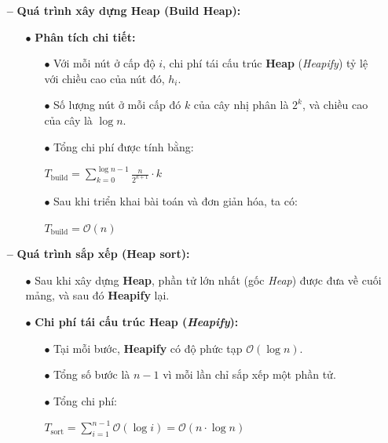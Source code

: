 \begin{itemize}
    \item [\textbf{--}] \textbf{Quá trình xây dựng Heap (Build Heap):}
    \begin{itemize}
        \item [$\bullet$] \textbf{Phân tích chi tiết:}
        \begin{itemize}
            \item [$\bullet$] Với mỗi nút ở cấp độ $i$, chi phí tái cấu trúc \textbf{Heap} (\textit{Heapify}) tỷ lệ với chiều cao của nút đó, $h_i$.
            \item [$\bullet$] Số lượng nút ở mỗi cấp đó $k$ của cây nhị phân là $2^k$, và chiều cao của cây là $\log n$.
            \item [$\bullet$] Tổng chi phí được tính bằng:\cite{basir2020analisis}
            \begin{center}
                $T_{\text{build}} = \sum_{k=0}^{\log n - 1} \frac{n}{2^{k+1}} \cdot k$
            \end{center}
            \item [$\bullet$] Sau khi triển khai bài toán và đơn giản hóa, ta có:
            \begin{center}
                $T_{\text{build}} = \mathcal{O}(n)$
            \end{center}
        \end{itemize}
    \end{itemize}
    \item [\textbf{--}] \textbf{Quá trình sắp xếp (Heap sort):}
    \begin{itemize}
        \item [$\bullet$] Sau khi xây dựng \textbf{Heap}, phần tử lớn nhất (gốc \textit{Heap}) được đưa về cuối mảng, và sau đó \textbf{Heapify} lại.
        \item [$\bullet$] \textbf{Chi phí tái cấu trúc Heap (\textit{Heapify}):}
        \begin{itemize}
            \item [$\bullet$] Tại mỗi bước, \textbf{Heapify} có độ phức tạp $\mathcal{O}(\log n)$.
            \item [$\bullet$] Tổng số bước là $n-1$ vì mỗi lần chỉ sắp xếp một phần tử.
            \item [$\bullet$] Tổng chi phí:
            \begin{center}
                $T_{\text{sort}} = \sum_{i=1}^{n-1} \mathcal{O}(\log i) = \mathcal{O}(n \cdot \log n)$
            \end{center}

\end{itemize}
\end{itemize}
\end{itemize}
